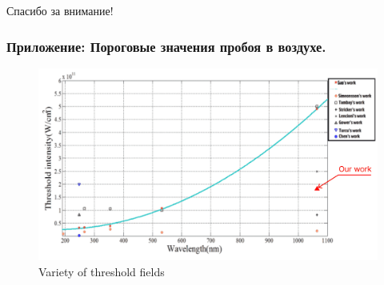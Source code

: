 \documentclass{beamer}
\begin{document}
	\begin{frame}[plain,c]
		
		\begin{center}
			\huge {} Спасибо за внимание!
		\end{center}
		
	\end{frame}
	
	\begin{frame}
		\frametitle{Приложение: Пороговые значения пробоя в воздухе.}
		
		\begin{figure}
			\centering
			\includegraphics[width=\linewidth]{res/air_threshold_variety.png}
			\caption*{Variety of threshold fields}
		\end{figure}
	\end{frame}
	
\end{document}
